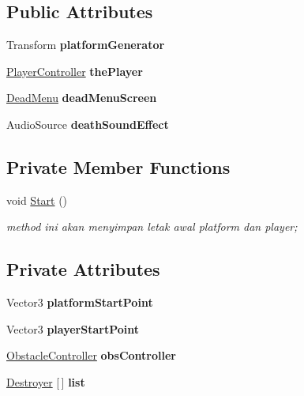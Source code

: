 \subsection*{Public Attributes}
\begin{DoxyCompactItemize}
\item 
\hypertarget{class_dead_and_restart_a7700d89251ec094e373a0fe7e61f09f9}{}\label{class_dead_and_restart_a7700d89251ec094e373a0fe7e61f09f9} 
Transform {\bfseries platform\+Generator}
\item 
\hypertarget{class_dead_and_restart_aba66184a8d37c05c78f86e2c83628eae}{}\label{class_dead_and_restart_aba66184a8d37c05c78f86e2c83628eae} 
\hyperlink{class_player_controller}{Player\+Controller} {\bfseries the\+Player}
\item 
\hypertarget{class_dead_and_restart_a855a9b0c48730b94b800589d74d887ae}{}\label{class_dead_and_restart_a855a9b0c48730b94b800589d74d887ae} 
\hyperlink{class_dead_menu}{Dead\+Menu} {\bfseries dead\+Menu\+Screen}
\item 
\hypertarget{class_dead_and_restart_a68ea47d86cdc8884858f2951ae90c063}{}\label{class_dead_and_restart_a68ea47d86cdc8884858f2951ae90c063} 
Audio\+Source {\bfseries death\+Sound\+Effect}
\end{DoxyCompactItemize}
\subsection*{Private Member Functions}
\begin{DoxyCompactItemize}
\item 
void \hyperlink{class_dead_and_restart_ace49e4505012656acdfdf947e22cfaab}{Start} ()
\begin{DoxyCompactList}\small\item\em method ini akan menyimpan letak awal platform dan player; \end{DoxyCompactList}\end{DoxyCompactItemize}
\subsection*{Private Attributes}
\begin{DoxyCompactItemize}
\item 
\hypertarget{class_dead_and_restart_ad88cf9f54b6f7ab52dcfb9231c2e881d}{}\label{class_dead_and_restart_ad88cf9f54b6f7ab52dcfb9231c2e881d} 
Vector3 {\bfseries platform\+Start\+Point}
\item 
\hypertarget{class_dead_and_restart_a5fc332be57d38f79d00e1f59c3e1fec0}{}\label{class_dead_and_restart_a5fc332be57d38f79d00e1f59c3e1fec0} 
Vector3 {\bfseries player\+Start\+Point}
\item 
\hypertarget{class_dead_and_restart_add548a0fec72d4ddd716e4769f99ecd7}{}\label{class_dead_and_restart_add548a0fec72d4ddd716e4769f99ecd7} 
\hyperlink{class_obstacle_controller}{Obstacle\+Controller} {\bfseries obs\+Controller}
\item 
\hypertarget{class_dead_and_restart_ad4a397b1236d0a27ad6b96daf7421064}{}\label{class_dead_and_restart_ad4a397b1236d0a27ad6b96daf7421064} 
\hyperlink{class_destroyer}{Destroyer} \mbox{[}$\,$\mbox{]} {\bfseries list}
\end{DoxyCompactItemize}


